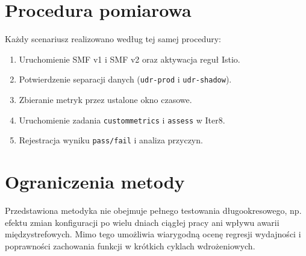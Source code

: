 \section{Procedura pomiarowa}
Każdy scenariusz realizowano według tej samej procedury:
\begin{enumerate}
    \item Uruchomienie SMF v1 i SMF v2 oraz aktywacja reguł Istio.
    \item Potwierdzenie separacji danych (\texttt{udr-prod} i \texttt{udr-shadow}).
    \item Zbieranie metryk przez ustalone okno czasowe.
    \item Uruchomienie zadania \texttt{custommetrics} i \texttt{assess} w Iter8.
    \item Rejestracja wyniku \texttt{pass/fail} i analiza przyczyn.
\end{enumerate}

\section{Ograniczenia metody}
Przedstawiona metodyka nie obejmuje pełnego testowania długookresowego, np. efektu zmian konfiguracji po wielu dniach ciągłej pracy ani wpływu awarii międzystrefowych. Mimo tego umożliwia wiarygodną ocenę regresji wydajności i poprawności zachowania funkcji w krótkich cyklach wdrożeniowych.
